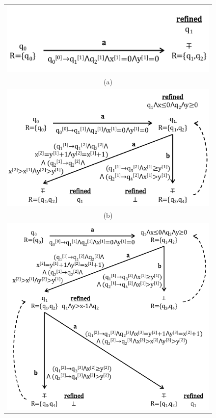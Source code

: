 \documentclass[10pt]{llncs}
\begin{document}
\begin{figure}[htb]
\begin{center}
\begin{minipage}{6cm}
\begin{tabular}{c}
\includegraphics[scale=0.60]{IM1.pdf} \\
\tiny{(a)} \\
\includegraphics[scale=0.60]{IM2.pdf} \\[-2mm]
\tiny{(b)} \\
\includegraphics[scale=0.60]{IM3.pdf} \\[-2mm]

\end{tabular}
\end{minipage}
\end{center}
\end{figure}
\end{document}
